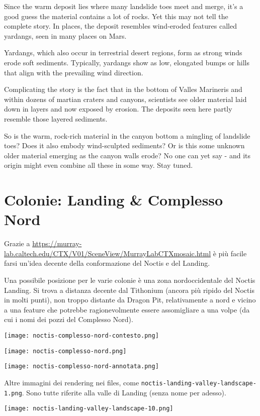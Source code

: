 \documentclass[a4paper,10pt,openany,oneside]{memoir}
\begin{document}
Since the warm deposit lies where many landslide toes meet and merge, it's a good guess the material contains a lot of rocks. Yet this may not tell the complete story. In places, the deposit resembles wind-eroded features called yardangs, seen in many places on Mars.
 
Yardangs, which also occur in terrestrial desert regions, form as strong winds erode soft sediments. Typically, yardangs show as low, elongated bumps or hills that align with the prevailing wind direction.
 
Complicating the story is the fact that in the bottom of Valles Marineris and within dozens of martian craters and canyons, scientists see older material laid down in layers and now exposed by erosion. The deposits seen here partly resemble those layered sediments.
 
So is the warm, rock-rich material in the canyon bottom a mingling of landslide toes? Does it also embody wind-sculpted sediments? Or is this some unknown older material emerging as the canyon walls erode? No one can yet say - and its origin might even combine all these in some way. Stay tuned.


\section{Colonie: Landing \& Complesso Nord}

Grazie a \url{https://murray-lab.caltech.edu/CTX/V01/SceneView/MurrayLabCTXmosaic.html} è più facile farsi un'idea decente della conformazione del Noctis e del Landing.

Una possibile posizione per le varie colonie è una zona nordoccidentale del Noctis Landing. Si trova a distanza decente dal Tithonium (ancora più ripido del Noctis in molti punti), non troppo distante da Dragon Pit, relativamente a nord e vicino a una feature che potrebbe ragionevolmente essere assomigliare a una volpe (da cui i nomi dei pozzi del Complesso Nord).

\texttt{[image: noctis-complesso-nord-contesto.png]}

\texttt{[image: noctis-complesso-nord.png]}

\texttt{[image: noctis-complesso-nord-annotata.png]}

Altre immagini dei rendering nei files, come \texttt{noctis-landing-valley-landscape-1.png}. Sono tutte riferite alla valle di Landing (senza nome per adesso).

\texttt{[image: noctis-landing-valley-landscape-10.png]}
\end{document}
